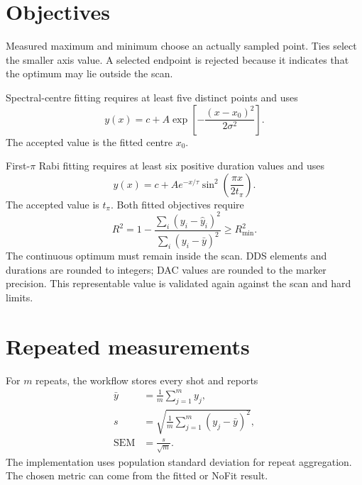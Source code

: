 \documentclass[11pt,oneside,openany]{book}
\begin{document}
\section{Objectives}
Measured maximum and minimum choose an actually sampled point. Ties select the smaller
axis value. A selected endpoint is rejected because it indicates that the optimum may lie
outside the scan.

Spectral-centre fitting requires at least five distinct points and uses
\begin{equation}
  y(x)=c+A\exp\!\left[-\frac{(x-x_0)^2}{2\sigma^2}\right].
\end{equation}
The accepted value is the fitted centre $x_0$.

First-$\pi$ Rabi fitting requires at least six positive duration values and uses
\begin{equation}
  y(x)=c+A e^{-x/\tau}\sin^2\!\left(\frac{\pi x}{2t_\pi}\right).
\end{equation}
The accepted value is $t_\pi$. Both fitted objectives require
\begin{equation}
  R^2=1-\frac{\sum_i(y_i-\hat y_i)^2}{\sum_i(y_i-\bar y)^2}
  \ge R^2_{\min}.
\end{equation}
The continuous optimum must remain inside the scan. DDS elements and durations are rounded
to integers; DAC values are rounded to the marker precision. This representable value is
validated again against the scan and hard limits.

\section{Repeated measurements}
For $m$ repeats, the workflow stores every shot and reports
\begin{align}
 \bar y &= \frac{1}{m}\sum_{j=1}^m y_j,\\
 s &= \sqrt{\frac{1}{m}\sum_{j=1}^m(y_j-\bar y)^2},\\
 \mathrm{SEM} &= \frac{s}{\sqrt{m}}.
\end{align}
The implementation uses population standard deviation for repeat aggregation. The chosen
metric can come from the fitted or NoFit result.
\end{document}
